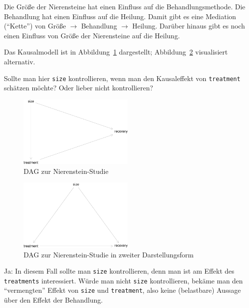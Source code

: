 \documentclass[
  a4paper,
  DIV=11]{scrreprt}
\theoremstyle{definition}
\theoremstyle{remark}
\begin{document}
Die Größe der Nierensteine hat einen Einfluss auf die
Behandlungsmethode. Die Behandlung hat einen Einfluss auf die Heilung.
Damit gibt es eine Mediation (``Kette'') von Größe \(\rightarrow\)
Behandlung \(\rightarrow\) Heilung. Darüber hinaus gibt es noch einen
Einfluss von Größe der Nierensteine auf die Heilung.

Das Kausalmodell ist in Abbildung~\ref{fig-dag-studie-c} dargestellt;
Abbildung~\ref{fig-dag-studie-c2} visualisiert alternativ.

Sollte man hier \texttt{size} kontrollieren, wenn man den Kausaleffekt
von \texttt{treatment} schätzen möchte? Oder lieber nicht kontrollieren?

\begin{figure}

{\centering \includegraphics[width=0.5\textwidth,height=\textheight]{./kausal_files/figure-pdf/fig-dag-studie-c-1.pdf}

}

\caption{\label{fig-dag-studie-c}DAG zur Nierenstein-Studie}

\end{figure}

\begin{figure}

{\centering \includegraphics[width=0.5\textwidth,height=\textheight]{./kausal_files/figure-pdf/fig-dag-studie-c2-1.pdf}

}

\caption{\label{fig-dag-studie-c2}DAG zur Nierenstein-Studie in zweiter
Darstellungsform}

\end{figure}

Ja: In diesem Fall sollte man \texttt{size} kontrollieren, denn man ist
am Effekt des \texttt{treatments} interessiert. Würde man nicht
\texttt{size} kontrollieren, bekäme man den ``vermengten'' Effekt von
\texttt{size} und \texttt{treatment}, also keine (belastbare) Aussage
über den Effekt der Behandlung.
\end{document}
